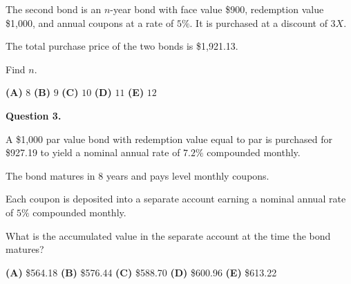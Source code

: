 \documentclass[11pt]{article}
\begin{document}
The second bond is an \(n\)-year bond with face value \$900, redemption value \$1{,}000, and annual coupons at a rate of \(5\%\). It is purchased at a discount of \(3X\).

The total purchase price of the two bonds is \$1{,}921.13.

Find \(n\).

\medskip

\begin{center}

\textbf{(A)} $8$
\hspace{1cm}
\textbf{(B)} $9$
\hspace{1cm}
\textbf{(C)} $10$
\hspace{1cm}
\textbf{(D)} $11$
\hspace{1cm}
\textbf{(E)} $12$

\end{center}

\newpage


\noindent\textbf{Question 3.}

A \$1{,}000 par value bond with redemption value equal to par is purchased for \$927.19 to yield a nominal annual rate of \(7.2\%\) compounded monthly.

The bond matures in 8 years and pays level monthly coupons.

Each coupon is deposited into a separate account earning a nominal annual rate of \(5\%\) compounded monthly.

What is the accumulated value in the separate account at the time the bond matures?

\medskip

\begin{center}

\textbf{(A)} \$564.18
\hspace{1cm}
\textbf{(B)} \$576.44
\hspace{1cm}
\textbf{(C)} \$588.70
\hspace{1cm}
\textbf{(D)} \$600.96
\hspace{1cm}
\textbf{(E)} \$613.22

\end{center}
\end{document}
